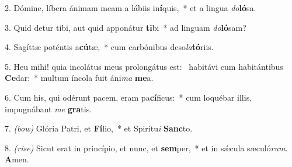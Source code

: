 ﻿2. Dómine, líbera ánimam meam a lábiis in\textbf{í}quis,~* et a lingua \textit{do}\textbf{ló}sa.

3. Quid detur tibi, aut quid apponátur \textbf{ti}bi~* ad linguam \textit{do}\textbf{ló}sam?

4. Sagíttæ poténtis a\textbf{cú}tæ,~* cum carbónibus deso\textit{la}\textbf{tó}riis.

5. Heu mihi! quia incolátus meus prolongátus est:~{\color{red}\GreDagger} habitávi cum habitántibus \textbf{Ce}dar:~* multum íncola fuit áni\textit{ma} \textbf{me}a.

6. Cum his, qui odérunt pacem, eram pa\textbf{cí}ficus:~* cum loquébar illis, impugnábant \textit{me} \textbf{gra}tis.

7. {\color{red}\textit{(bow)}} Glória Patri, et \textbf{Fí}lio,~* et Spirítu\textit{i} \textbf{Sanc}to.

8. {\color{red}\textit{(rise)}} Sicut erat in princípio, et nunc, et \textbf{sem}per,~* et in s\'{\ae}cula sæculó\textit{rum}. \textbf{A}men.
